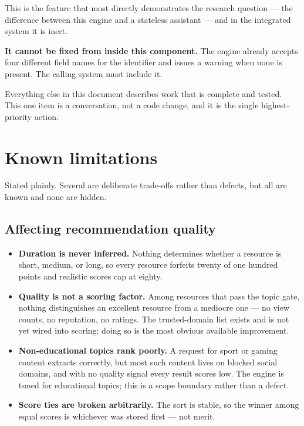 \documentclass[11pt,a4paper]{article}
\begin{document}
This is the feature that most directly demonstrates the research question ---
the difference between this engine and a stateless assistant --- and in the
integrated system it is inert.

\textbf{It cannot be fixed from inside this component.} The engine already
accepts four different field names for the identifier and issues a warning
when none is present. The calling system must include it.

Everything else in this document describes work that is complete and tested.
This one item is a conversation, not a code change, and it is the single
highest-priority action.

\newpage
\section{Known limitations}

Stated plainly. Several are deliberate trade-offs rather than defects, but all
are known and none are hidden.

\subsection{Affecting recommendation quality}

\begin{itemize}
\item \textbf{Duration is never inferred.} Nothing determines whether a
resource is short, medium, or long, so every resource forfeits twenty of one
hundred points and realistic scores cap at eighty.

\item \textbf{Quality is not a scoring factor.} Among resources that pass the
topic gate, nothing distinguishes an excellent resource from a mediocre one
--- no view counts, no reputation, no ratings. The trusted-domain list exists
and is not yet wired into scoring; doing so is the most obvious available
improvement.

\item \textbf{Non-educational topics rank poorly.} A request for sport or
gaming content extracts correctly, but most such content lives on blocked
social domains, and with no quality signal every result scores low. The engine
is tuned for educational topics; this is a scope boundary rather than a
defect.

\item \textbf{Score ties are broken arbitrarily.} The sort is stable, so the
winner among equal scores is whichever was stored first --- not merit.
\end{itemize}
\end{document}
